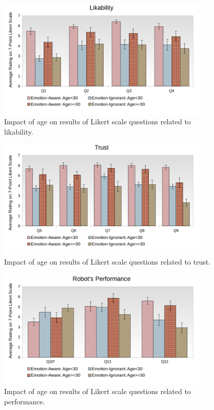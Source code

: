 \documentclass[12pt]{report}
\begin{document}
\begin{figure}[tbh]
\centering
\includegraphics[width=0.9\textwidth]{figure/Age-Likability.png}
\caption{Impact of age on results of Likert scale questions related to
likability.}
\label{fig:age-likability}
\vspace*{15mm}
\end{figure}

\begin{figure}[!h]
\centering
\includegraphics[width=0.9\textwidth]{figure/Age-Trust.png}
\caption{Impact of age on results of Likert scale questions related to trust.}
\label{fig:age-trust}
\vspace*{15mm}
\end{figure}

\begin{figure}[!h]
\centering
\includegraphics[width=0.9\textwidth]{figure/Age-Performance.png}
\caption{Impact of age on results of Likert scale questions related to
performance.}
\label{fig:age-performance}
\vspace*{15mm}
\end{figure}
\end{document}

